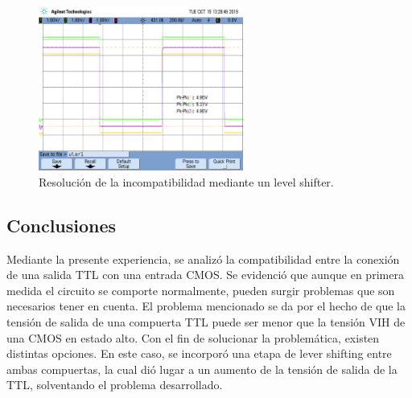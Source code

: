 \begin{figure}[H]
    \centering
    \includegraphics[width=0.6\textwidth]{figs/ej5/levelshifter10k1k.png}
    \caption{Resoluci\'on de la incompatibilidad mediante un level shifter.}
    \label{ej5_fig:pull_up}
\end{figure}
\subsection{Conclusiones}
\noindent
Mediante la presente experiencia, se analiz\'o la compatibilidad entre la conexi\'on de una salida TTL con una entrada CMOS. Se evidenci\'o que aunque en primera medida el circuito se comporte normalmente, pueden surgir problemas que son necesarios tener en cuenta.
\noindent
El problema mencionado se da por el hecho de que la tensi\'on de salida de una compuerta TTL puede ser menor que la tensi\'on VIH de una CMOS en estado alto. Con el fin de solucionar la problem\'atica, existen distintas opciones. En este caso, se incorpor\'o una etapa de lever shifting entre ambas compuertas, la cual di\'o lugar a un aumento de la tensi\'on de salida de la TTL, solventando el problema desarrollado.